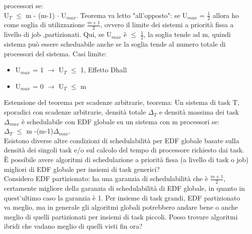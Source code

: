 \documentclass[12pt, oneside]{extbook}
\begin{document}
processori se: \\ U$_T$ $\leq$ m - (m-1) $\cdot$ U$_{max}$. Teorema va letto "all'opposto": se U$_{max}$ = $\frac{1}{2}$ allora ho come soglia di utilizzazione $\frac{m +1 }{2}$, ovvero il limite dei sistemi a priorità fissa a livello di job ,partizionati. Qui, se U$_{max}$ è $\leq$ $\frac{1}{2}$, la soglia tende ad m, quindi sistema può essere scheduabile anche se la soglia tende al numero totale di processori del sistema. Casi limite:
\begin{itemize}
\item U$_{max}$ = 1 $\rightarrow$ U$_T$ $\leq$ 1, Effetto Dhall
\item U$_{max}$ = 0 $\rightarrow$ U$_T$ $\leq$ m
\end{itemize}
Estensione del teorema per scadenze arbitrarie, teorema: Un sistema di task T, sporadici con scadenze arbitrarie, densità totale $\Delta_T$ e densità massima dei task $\Delta_{max}$ è schedulabile con EDF globale su un sistema con m processori se:\\ $\Delta_T$ $\leq$ m -(m-1)$\Delta_{max}$.\\ Esistono diverse altre condizioni di schedulabilità per EDF globale basate sulla densità dei singoli task e/o sul calcolo del tempo di processore richiesto dai task. È possibile avere algoritmi di schedulazione a priorità fissa (a livello di task o job) migliori di EDF globale per insiemi di task generici?\\ Considero EDF partizionato: ha una garanzia di schedulabilità che è $\frac{m+1}{2}$, certamente migliore della garanzia di schedulabilità di EDF globale, in quanto in quest'ultimo caso la garanzia è 1. Per insieme di task grandi, EDF partizionato va meglio, ma in generale gli algoritmi globali potrebbero andare bene o anche meglio di quelli partizionati per insiemi di task piccoli. Posso trovare algoritmi ibridi che vadano meglio di quelli visti fin ora?
\end{document}
